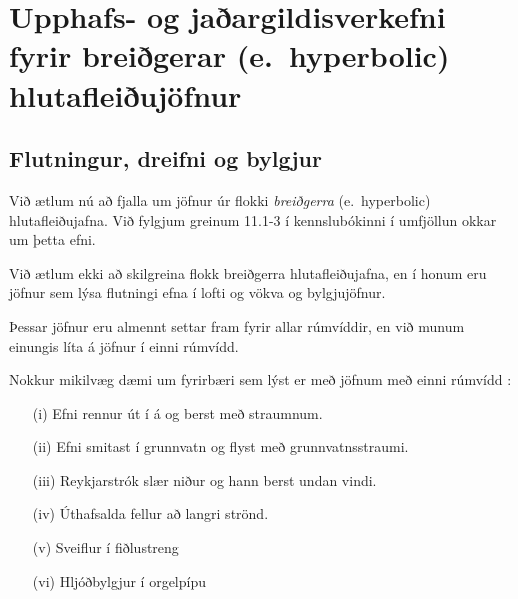 \documentclass[icelandic,a4paper,12pt]{article}
\begin{document}
\section{Upphafs- og jaðargildisverkefni fyrir breiðgerar (e.~hyperbolic)  hlutafleiðujöfnur}




\subsection{Flutningur, dreifni og bylgjur} 
Við ætlum nú að fjalla um jöfnur úr flokki {\it breiðgerra}
(e.~hyperbolic) hlutafleiðujafna.  
Við fylgjum greinum 11.1-3 í kennslubókinni í umfjöllun okkar um þetta
efni. 

\smallskip
Við ætlum ekki að skilgreina flokk breiðgerra hlutafleiðujafna, 
en í honum eru jöfnur sem lýsa flutningi efna í lofti og vökva
og bylgjujöfnur.   

\smallskip
Þessar jöfnur eru almennt settar fram 
 fyrir allar rúmvíddir, en við munum einungis
líta á jöfnur í einni rúmvídd.  

\smallskip
Nokkur mikilvæg dæmi um fyrirbæri sem lýst er með jöfnum með einni rúmvídd :
\begin{enumerate}
\item[(i)]   Efni rennur út í á og berst með straumnum.
\item[(ii)]  Efni smitast í grunnvatn og  flyst með grunnvatnsstraumi.
\item[(iii)] Reykjarstrók slær niður og hann berst undan vindi.
\item[(iv)]  Úthafsalda fellur að langri strönd.
\item[(v)]   Sveiflur í fiðlustreng
\item[(vi)]  Hljóðbylgjur í orgelpípu
\end{enumerate}
\end{document}
